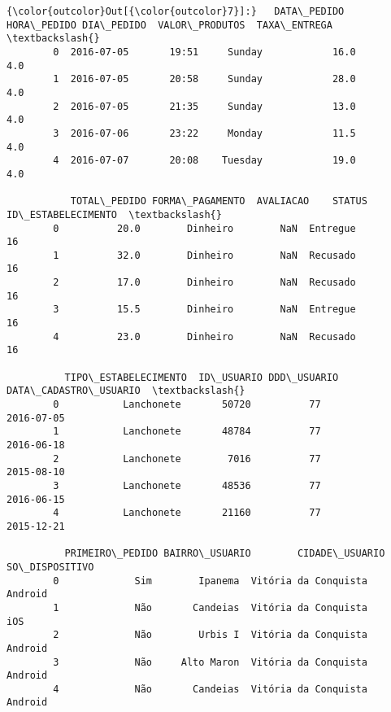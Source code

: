 \documentclass[11pt]{article}
\begin{document}
\begin{Verbatim}[commandchars=\\\{\}]
{\color{outcolor}Out[{\color{outcolor}7}]:}   DATA\_PEDIDO HORA\_PEDIDO DIA\_PEDIDO  VALOR\_PRODUTOS  TAXA\_ENTREGA  \textbackslash{}
        0  2016-07-05       19:51     Sunday            16.0           4.0   
        1  2016-07-05       20:58     Sunday            28.0           4.0   
        2  2016-07-05       21:35     Sunday            13.0           4.0   
        3  2016-07-06       23:22     Monday            11.5           4.0   
        4  2016-07-07       20:08    Tuesday            19.0           4.0   
        
           TOTAL\_PEDIDO FORMA\_PAGAMENTO  AVALIACAO    STATUS  ID\_ESTABELECIMENTO  \textbackslash{}
        0          20.0        Dinheiro        NaN  Entregue                  16   
        1          32.0        Dinheiro        NaN  Recusado                  16   
        2          17.0        Dinheiro        NaN  Recusado                  16   
        3          15.5        Dinheiro        NaN  Entregue                  16   
        4          23.0        Dinheiro        NaN  Recusado                  16   
        
          TIPO\_ESTABELECIMENTO  ID\_USUARIO DDD\_USUARIO DATA\_CADASTRO\_USUARIO  \textbackslash{}
        0           Lanchonete       50720          77            2016-07-05   
        1           Lanchonete       48784          77            2016-06-18   
        2           Lanchonete        7016          77            2015-08-10   
        3           Lanchonete       48536          77            2016-06-15   
        4           Lanchonete       21160          77            2015-12-21   
        
          PRIMEIRO\_PEDIDO BAIRRO\_USUARIO        CIDADE\_USUARIO SO\_DISPOSITIVO  
        0             Sim        Ipanema  Vitória da Conquista        Android  
        1             Não       Candeias  Vitória da Conquista            iOS  
        2             Não        Urbis I  Vitória da Conquista        Android  
        3             Não     Alto Maron  Vitória da Conquista        Android  
        4             Não       Candeias  Vitória da Conquista        Android  
\end{Verbatim}
            
\end{document}
